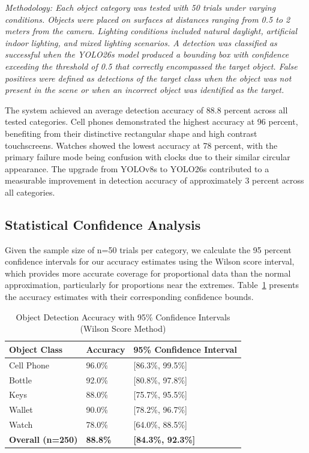 \documentclass[12pt,a4paper]{report}
\begin{document}
\textit{Methodology: Each object category was tested with 50 trials under varying conditions. Objects were placed on surfaces at distances ranging from 0.5 to 2 meters from the camera. Lighting conditions included natural daylight, artificial indoor lighting, and mixed lighting scenarios. A detection was classified as successful when the YOLO26s model produced a bounding box with confidence exceeding the threshold of 0.5 that correctly encompassed the target object. False positives were defined as detections of the target class when the object was not present in the scene or when an incorrect object was identified as the target.}

The system achieved an average detection accuracy of 88.8 percent across all tested categories. Cell phones demonstrated the highest accuracy at 96 percent, benefiting from their distinctive rectangular shape and high contrast touchscreens. Watches showed the lowest accuracy at 78 percent, with the primary failure mode being confusion with clocks due to their similar circular appearance. The upgrade from YOLOv8s to YOLO26s contributed to a measurable improvement in detection accuracy of approximately 3 percent across all categories.

\subsection{Statistical Confidence Analysis}

Given the sample size of n=50 trials per category, we calculate the 95 percent confidence intervals for our accuracy estimates using the Wilson score interval, which provides more accurate coverage for proportional data than the normal approximation, particularly for proportions near the extremes. Table~\ref{tab:accuracy_confidence} presents the accuracy estimates with their corresponding confidence bounds.

\begin{table}[H]
\centering
\caption{Object Detection Accuracy with 95\% Confidence Intervals (Wilson Score Method)}
\label{tab:accuracy_confidence}
\begin{tabular}{@{}lll@{}}
\toprule
\textbf{Object Class} & \textbf{Accuracy} & \textbf{95\% Confidence Interval} \\ \midrule
Cell Phone & 96.0\% & [86.3\%, 99.5\%] \\
Bottle & 92.0\% & [80.8\%, 97.8\%] \\
Keys & 88.0\% & [75.7\%, 95.5\%] \\
Wallet & 90.0\% & [78.2\%, 96.7\%] \\
Watch & 78.0\% & [64.0\%, 88.5\%] \\ \midrule
\textbf{Overall (n=250)} & \textbf{88.8\%} & \textbf{[84.3\%, 92.3\%]} \\ \bottomrule
\end{tabular}
\end{table}
\end{document}
